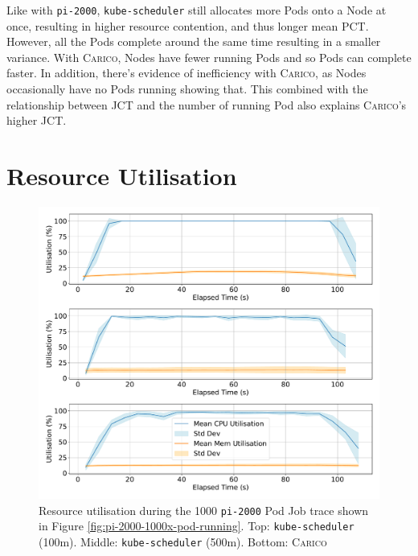 Like with \texttt{pi-2000}, \texttt{kube-scheduler} still allocates more Pods
onto a Node at once, resulting in higher resource contention, and thus longer
mean PCT. However, all the Pods complete around the same time resulting in a
smaller variance. With \textsc{Carico}, Nodes have fewer running Pods and so
Pods can complete faster. In addition, there's evidence of inefficiency with
\textsc{Carico}, as Nodes occasionally have no Pods running showing that. This
combined with the relationship between JCT and the number of running Pod also
explains \textsc{Carico}'s higher JCT.
%
%
%
\section{Resource Utilisation}
\label{sec:eval-util}

\begin{figure}[h]
    \centering
    \includegraphics[width=\textwidth]{images/pi-util.pdf}
    \caption{Resource utilisation during the 1000 \texttt{pi-2000} Pod
    Job trace shown in Figure \ref{fig:pi-2000-1000x-pod-running}. Top:
    \texttt{kube-scheduler} (100m). Middle: \texttt{kube-scheduler} (500m).
    Bottom: \textsc{Carico}}
    \label{fig:pi-2000-1000x-pod-util}
\end{figure}

